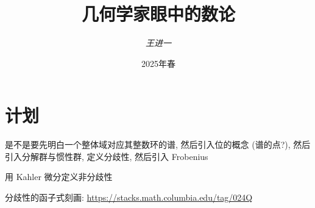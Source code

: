 \documentclass{book}
\begin{document}
	
	
	\title{几何学家眼中的数论}
	
	\author{\emph{王进一}}
	
	\date{2025年春}
	
	\maketitle
	
	\newpage
	
	\section*{计划}
	
	是不是要先明白一个整体域对应其整数环的谱, 然后引入位的概念 (谱的点?), 然后引入分解群与惯性群, 定义分歧性, 然后引入 Frobenius
	
	用 Kahler 微分定义非分歧性
	
	分歧性的函子式刻画: \url{https://stacks.math.columbia.edu/tag/024Q}
	
\end{document}
